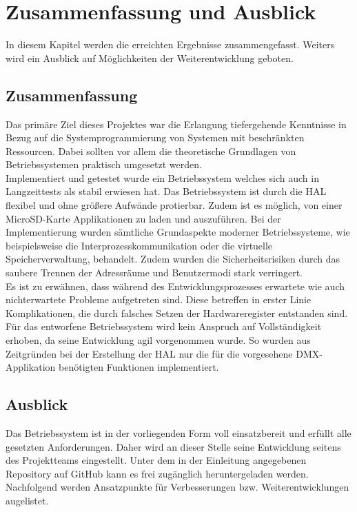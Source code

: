 \section{Zusammenfassung und Ausblick}
\label{summary}

In diesem Kapitel werden die erreichten Ergebnisse zusammengefasst. Weiters wird ein Ausblick auf Möglichkeiten der Weiterentwicklung geboten.

\subsection{Zusammenfassung}

Das primäre Ziel dieses Projektes war die Erlangung tiefergehende Kenntnisse in Bezug auf die Systemprogrammierung von Systemen mit beschränkten Ressourcen. Dabei sollten vor allem die theoretische Grundlagen von Betriebssystemen praktisch umgesetzt werden. \\
 
Implementiert und getestet wurde ein Betriebssystem welches sich auch in Langzeittests als stabil erwiesen hat. Das Betriebssystem ist durch die HAL flexibel und ohne größere Aufwände protierbar. Zudem ist es möglich, von einer MicroSD-Karte Applikationen zu laden und auszuführen. 
Bei der Implementierung wurden sämtliche Grundaspekte moderner Betriebssysteme, wie beispielsweise die Interprozesskommunikation oder die virtuelle Speicherverwaltung, behandelt. Zudem wurden die Sicherheitsrisiken durch das saubere Trennen der Adressräume und Benutzermodi stark verringert. \\
 
Es ist zu erwähnen, dass während des Entwicklungsprozesses erwartete wie auch nichterwartete Probleme aufgetreten sind. Diese betreffen in erster Linie Komplikationen, die durch falsches Setzen der Hardwareregister entstanden sind. \\
 
Für das entworfene Betriebssystem wird kein Anspruch auf Vollständigkeit erhoben, da seine Entwicklung agil vorgenommen wurde. So wurden aus Zeitgründen bei der Erstellung der HAL nur die für die vorgesehene DMX-Applikation benötigten Funktionen implementiert. \\
 

\subsection{Ausblick}

Das Betriebssystem ist in der vorliegenden Form voll einsatzbereit und erfüllt alle gesetzten Anforderungen. Daher wird an dieser Stelle seine Entwicklung seitens des Projektteams eingestellt. Unter dem in der Einleitung angegebenen Repository auf GitHub kann es frei zugänglich heruntergeladen werden. Nachfolgend werden Ansatzpunkte für Verbesserungen bzw. Weiterentwicklungen augelistet.

